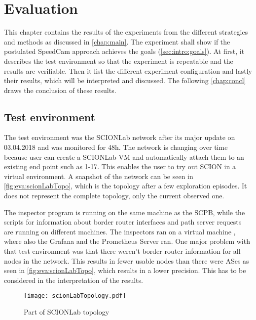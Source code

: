 \documentclass[thesis.tex]{subfiles}
\begin{document}
\chapter{Evaluation}\label{chap:eva}

This chapter contains the results of the experiments from the different strategies and methods as discussed in \autoref{chap:main}. The experiment shall show if the postulated SpeedCam approach achieves the goals (\autoref{sec:intro:goals}). At first, it describes the test environment so that the experiment is repeatable and the results are verifiable. Then it list the different experiment configuration and lastly their results, which will be interpreted and discussed. The following \autoref{chap:concl} draws the conclusion of these results.

\section{Test environment}

The test environment was the SCIONLab network after its major update on 03.04.2018 and was monitored for 48h. The network is changing over time because user can create a SCIONLab VM and automatically attach them to an existing end point such as 1-17. This enables the user to try out SCION in a virtual environment. A snapshot of the network can be seen in \autoref{fig:eva:scionLabTopo}, which is the topology after a few exploration episodes. It does not represent the complete topology, only the current observed one. 

The inspector program is running on the same machine as the SCPB, while the scripts for information about border router interfaces and path server requests are running on different machines. The inspectors ran on a virtual machine , where also the Grafana and the Prometheus Server ran. One major problem with that test environment was that there weren't border router information for all nodes in the network. This results in fewer usable nodes than there were ASes as seen in \autoref{fig:eva:scionLabTopo}, which results in a lower precision. This has to be considered in the interpretation of the results.

\begin{figure}
	\centering
	\texttt{[image: scionLabTopology.pdf]}
	\caption{Part of SCIONLab topology}
	\label{fig:eva:scionLabTopo}
\end{figure}
\end{document}
